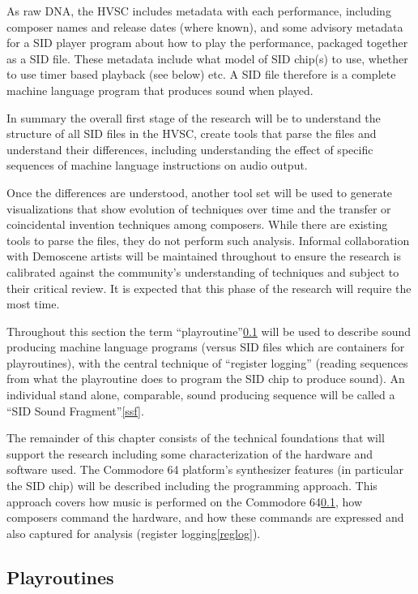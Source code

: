 \documentclass[10pt]{article}
\begin{document}
\begin{multicols*}{2}
As raw DNA, the HVSC includes metadata with each performance, including composer names and release dates (where known), and some advisory metadata for a SID player program about how to play the performance, packaged together as a SID file\cite{sidfile}. These metadata include what model of SID chip(s) to use, whether to use timer based playback (see below) etc. A SID file therefore is a complete machine language program that produces sound when played.

In summary the overall first stage of the research will be to understand the structure of all SID files in the HVSC, create tools that parse the files and understand their differences, including understanding the effect of specific sequences of machine language instructions on audio output.

Once the differences are understood, another tool set will be used to generate visualizations that show evolution of techniques over time and the transfer or coincidental invention techniques among composers. While there are existing tools\cite{ChiptuneSAK} to parse the files, they do not perform such analysis. Informal collaboration with Demoscene artists will be maintained throughout to ensure the research is calibrated against the community’s understanding of techniques and subject to their critical review. It is expected that this phase of the research will require the most time.

Throughout this section the term “playroutine”\ref{playroutines} will be used to describe sound producing machine language programs (versus SID files which are containers for playroutines), with the central technique of “register logging” (reading sequences from what the playroutine does to program the SID chip to produce sound). An individual stand alone, comparable, sound producing sequence will be called a “SID Sound Fragment”\ref{ssf}.

The remainder of this chapter consists of the technical foundations that will support the research including some characterization of the hardware and software used. The Commodore 64 platform’s synthesizer features (in particular the SID chip) will be described including the programming approach. This approach covers how music is performed on the Commodore 64\ref{playroutines}, how composers command the hardware, and how these commands are expressed and also captured for analysis (register logging\ref{reglog}).

\subsection{Playroutines}
\label{playroutines}


\end{multicols*}
\end{document}
